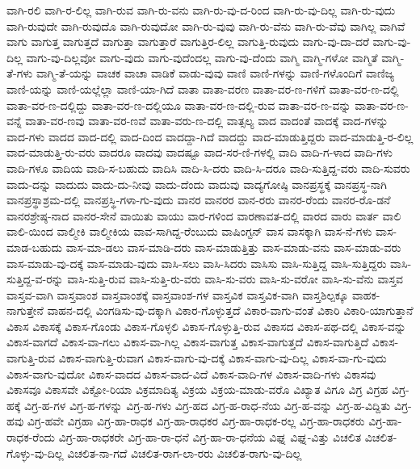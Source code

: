 {ವಾಗಿ-ರಲಿ
ವಾಗಿ-ರ-ಲಿಲ್ಲ
ವಾಗಿ-ರುವ
ವಾಗಿ-ರು-ವನು
ವಾಗಿ-ರು-ವು-ದ-ರಿಂದ
ವಾಗಿ-ರು-ವು-ದಿಲ್ಲ
ವಾಗಿ-ರು-ವುದು
ವಾಗಿ-ರುವುದೇ
ವಾಗಿ-ರುವುದೊ
ವಾಗಿ-ರುವುದೋ
ವಾಗಿ-ರು-ವುವು
ವಾಗಿ-ರು-ವೆನು
ವಾಗಿ-ರು-ವೆವು
ವಾಗಿಲ್ಲ
ವಾಗಿವೆ
ವಾಗು
ವಾಗುತ್ತ
ವಾಗುತ್ತದೆ
ವಾಗುತ್ತಾ
ವಾಗುತ್ತಾರೆ
ವಾಗುತ್ತಿರ-ಲಿಲ್ಲ
ವಾಗುತ್ತಿ-ರುವುದು
ವಾಗು-ವು-ದಾ-ದರೆ
ವಾಗು-ವು-ದಿಲ್ಲ
ವಾಗು-ವು-ದಿಲ್ಲವೋ
ವಾಗು-ವುದು
ವಾಗು-ವುದೆಂದಲ್ಲ
ವಾಗು-ವು-ದೆಂದು
ವಾಗ್ಮಿ
ವಾಗ್ಮಿ-ಗಳೋ
ವಾಗ್ಮಿತೆ
ವಾಗ್ಮಿ-ತೆ-ಗಳು
ವಾಗ್ಮಿ-ತೆ-ಯನ್ನು
ವಾಚಕ
ವಾಚಾ
ವಾಡಿಕೆ
ವಾಡು-ವುವು
ವಾಣಿ
ವಾಣಿ-ಗಳನ್ನು
ವಾಣಿ-ಗಳೊಂದಿಗೆ
ವಾಣಿಜ್ಯ
ವಾಣಿ-ಯನ್ನು
ವಾಣಿ-ಯಲ್ಲೆಲ್ಲಾ
ವಾಣಿ-ಯಾ-ಗಿದೆ
ವಾತಾ
ವಾತಾ-ವರಣ
ವಾತಾ-ವರ-ಣ-ಗಳಿಗೆ
ವಾತಾ-ವರ-ಣ-ದಲ್ಲಿ
ವಾತಾ-ವರ-ಣ-ದಲ್ಲಿದ್ದು
ವಾತಾ-ವರ-ಣ-ದಲ್ಲಿಯೂ
ವಾತಾ-ವರ-ಣ-ದಲ್ಲಿ-ರುವ
ವಾತಾ-ವರ-ಣ-ವನ್ನು
ವಾತಾ-ವರ-ಣ-ವನ್ನೆ
ವಾತಾ-ವರ-ಣವು
ವಾತಾ-ವರ-ಣವೆ
ವಾತಾ-ವರು-ಣ-ದಲ್ಲಿ
ವಾತ್ಸಲ್ಯ
ವಾದ
ವಾದಂತೆ
ವಾದಕ್ಕೆ
ವಾದ-ಗಳನ್ನು
ವಾದ-ಗಳು
ವಾದದ
ವಾದ-ದಲ್ಲಿ
ವಾದ-ದಿಂದ
ವಾದದ್ದಾ-ಗಿದೆ
ವಾದದ್ದು
ವಾದ-ಮಾಡುತ್ತಿದ್ದರು
ವಾದ-ಮಾಡುತ್ತಿ-ರ-ಲಿಲ್ಲ
ವಾದ-ಮಾಡುತ್ತಿ-ರು-ವರು
ವಾದರೂ
ವಾದವು
ವಾದಷ್ಟೂ
ವಾದ-ಸರ-ಣಿ-ಗಳಲ್ಲಿ
ವಾದಿ
ವಾದಿ-ಗ-ಳಾದ
ವಾದಿ-ಗಳು
ವಾದಿ-ಗಳೂ
ವಾದಿಯ
ವಾದಿ-ಸ-ಬಹುದು
ವಾದಿಸಿ
ವಾದಿ-ಸಿ-ದರು
ವಾದಿ-ಸಿ-ದರೂ
ವಾದಿ-ಸುತ್ತಿದ್ದ-ವರು
ವಾದಿ-ಸುವರು
ವಾದು-ದನ್ನು
ವಾದುದು
ವಾದು-ದು-ನೀವು
ವಾದು-ದೆಂದು
ವಾದುವು
ವಾದ್ಯಗೋಷ್ಠಿ
ವಾನಪ್ರಸ್ಥಕ್ಕೆ
ವಾನಪ್ರಸ್ಥ-ನಾಗಿ
ವಾನಪ್ರಸ್ಥಾಶ್ರಮ-ದಲ್ಲಿ
ವಾನಪ್ರಸ್ಥಿ-ಗಳಾ-ಗು-ವುದು
ವಾನರ
ವಾನರರ
ವಾನ-ರರು
ವಾನರ-ರೆಂದು
ವಾನರ-ರೊ-ಡನೆ
ವಾನರಶ್ರೇಷ್ಠ-ನಾದ
ವಾನರ-ಸೇನೆ
ವಾಯಿತು
ವಾಯು
ವಾರ-ಗಳಿಂದ
ವಾರಣಾವತ-ದಲ್ಲಿ
ವಾರದ
ವಾರು
ವಾರ್ತ
ವಾಲಿ
ವಾಲಿ-ಯಿಂದ
ವಾಲ್ಮೀಕಿ
ವಾಲ್ಮೀಕಿಯ
ವಾವ-ಸಾಗಿದ್ದ-ರೆಂಬುದು
ವಾಷಿಂಗ್ಟನ್
ವಾಸ
ವಾಸಕ್ಕಾಗಿ
ವಾಸ-ನೆ-ಗಳು
ವಾಸ-ಮಾಡ-ಬಹುದು
ವಾಸ-ಮಾ-ಡಲು
ವಾಸ-ಮಾಡಿ-ದರು
ವಾಸ-ಮಾಡುತ್ತಿತ್ತು
ವಾಸ-ಮಾಡು-ವನು
ವಾಸ-ಮಾಡು-ವರು
ವಾಸ-ಮಾಡು-ವು-ದಕ್ಕೆ
ವಾಸ-ಮಾಡು-ವುದು
ವಾಸಿ-ಸಲು
ವಾಸಿ-ಸಿದರು
ವಾಸಿಸು
ವಾಸಿ-ಸುತ್ತಿದ್ದ
ವಾಸಿ-ಸುತ್ತಿದ್ದರು
ವಾಸಿ-ಸುತ್ತಿದ್ದ-ವ-ರನ್ನು
ವಾಸಿ-ಸುತ್ತಿ-ರುವ
ವಾಸಿ-ಸುತ್ತಿ-ರು-ವರು
ವಾಸಿ-ಸು-ವರು
ವಾಸಿ-ಸು-ವರೋ
ವಾಸಿ-ಸು-ವೆನು
ವಾಸ್ತವ
ವಾಸ್ತವ-ವಾಗಿ
ವಾಸ್ತವಾಂಶ
ವಾಸ್ತವಾಂಶಕ್ಕೆ
ವಾಸ್ತವಾಂಶ-ಗಳ
ವಾಸ್ತವಿಕ
ವಾಸ್ತವಿಕ-ವಾಗಿ
ವಾಸ್ತಶಿಲ್ಪಕ್ಕೂ
ವಾಹಕ-ನಾಗುತ್ತೇನೆ
ವಾಹನ-ದಲ್ಲಿ
ವಿಂಗಡಿಸು-ವು-ದಕ್ಕಾಗಿ
ವಿಕಾರ-ಗೊಳ್ಳುತ್ತದೆ
ವಿಕಾರ-ವಾಗು-ವಂತೆ
ವಿಕಾರಿ
ವಿಕಾರಿ-ಯಾಗುತ್ತಾನೆ
ವಿಕಾಸ
ವಿಕಾಸಕ್ಕೆ
ವಿಕಾಸ-ಗೊಂಡು
ವಿಕಾಸ-ಗೊಳ್ಳಲಿ
ವಿಕಾಸ-ಗೊಳ್ಳುತ್ತಿ-ರುವ
ವಿಕಾಸದ
ವಿಕಾಸ-ಪಥ-ದಲ್ಲಿ
ವಿಕಾಸ-ವನ್ನು
ವಿಕಾಸ-ವಾಗದೆ
ವಿಕಾಸ-ವಾ-ಗಲು
ವಿಕಾಸ-ವಾ-ಗಿಲ್ಲ
ವಿಕಾಸ-ವಾಗುತ್ತ
ವಿಕಾಸ-ವಾಗುತ್ತದೆ
ವಿಕಾಸ-ವಾಗುತ್ತಿದೆ
ವಿಕಾಸ-ವಾಗುತ್ತಿ-ರುವ
ವಿಕಾಸ-ವಾಗುತ್ತಿ-ರುವಾಗ
ವಿಕಾಸ-ವಾಗು-ವು-ದಕ್ಕೆ
ವಿಕಾಸ-ವಾಗು-ವು-ದಿಲ್ಲ
ವಿಕಾಸ-ವಾ-ಗು-ವುದು
ವಿಕಾಸ-ವಾಗು-ವುದೋ
ವಿಕಾಸ-ವಾದದ
ವಿಕಾಸ-ವಾದ-ವಿದೆ
ವಿಕಾಸ-ವಾದಿ-ಗಳ
ವಿಕಾಸ-ವಾದಿ-ಗಳು
ವಿಕಾಸವು
ವಿಕಾಸವೂ
ವಿಕಾಸವೇ
ವಿಕ್ಟೋ-ರಿಯಾ
ವಿಕ್ರಮಾದಿತ್ಯ
ವಿಕ್ರಯ
ವಿಕ್ರಯ-ಮಾಡು-ವರೊ
ವಿಖ್ಯಾತ
ವಿಗೂ
ವಿಗ್ರ
ವಿಗ್ರಹ
ವಿಗ್ರ-ಹಕ್ಕೆ
ವಿಗ್ರ-ಹ-ಗಳ
ವಿಗ್ರ-ಹ-ಗಳನ್ನು
ವಿಗ್ರ-ಹ-ಗಳು
ವಿಗ್ರ-ಹದ
ವಿಗ್ರ-ಹ-ರಾಧ-ನೆಯ
ವಿಗ್ರ-ಹ-ವನ್ನು
ವಿಗ್ರ-ಹ-ವಿದ್ದಿತು
ವಿಗ್ರ-ಹವು
ವಿಗ್ರ-ಹವೇ
ವಿಗ್ರಹಾ
ವಿಗ್ರ-ಹಾ-ರಾಧಕ
ವಿಗ್ರ-ಹಾ-ರಾಧಕರ
ವಿಗ್ರ-ಹಾ-ರಾಧಕ-ರಲ್ಲ
ವಿಗ್ರ-ಹಾ-ರಾಧಕರು
ವಿಗ್ರ-ಹಾ-ರಾಧಕ-ರೆಂದು
ವಿಗ್ರ-ಹಾ-ರಾಧಕರೇ
ವಿಗ್ರ-ಹಾ-ರಾ-ಧನೆ
ವಿಗ್ರ-ಹಾ-ರಾ-ಧನೆಯ
ವಿಘ್ನ
ವಿಘ್ನ-ವಿತ್ತು
ವಿಚಲಿತ
ವಿಚಲಿತ-ಗೊಳ್ಳು-ವು-ದಿಲ್ಲ
ವಿಚಲಿತ-ನಾ-ಗದೆ
ವಿಚಲಿತ-ರಾಗ-ಲಾ-ರರು
ವಿಚಲಿತ-ರಾಗು-ವು-ದಿಲ್ಲ
}

